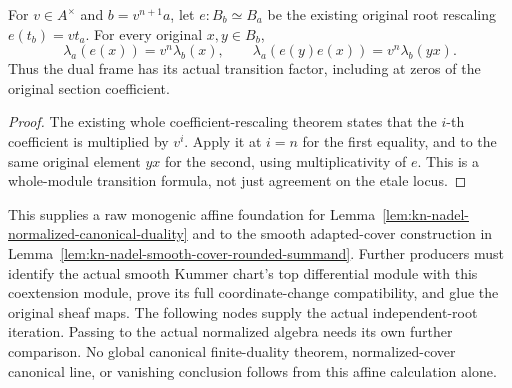 \begin{lemma}
\label{lem:kn-nadel-root-dual-rescaling}
\leanok
For $v\in A^\times$ and $b=v^{n+1}a$, let
$e:B_b\simeq B_a$ be the existing original root rescaling
$e(t_b)=v t_a$.  For every original $x,y\in B_b$,
\[
 \lambda_a(e(x))=v^n\lambda_b(x),\qquad
 \lambda_a(e(y)e(x))=v^n\lambda_b(yx).
\]
Thus the dual frame has its actual transition factor, including
at zeros of the original section coefficient.
\end{lemma}
\begin{proof}
The existing whole coefficient-rescaling theorem states that the
$i$-th coefficient is multiplied by $v^i$.  Apply it at $i=n$
for the first equality, and to the same original element $yx$ for
the second, using multiplicativity of $e$.  This is a whole-module
transition formula, not just agreement on the etale locus.
\end{proof}

This supplies a raw monogenic affine foundation for
Lemma~\ref{lem:kn-nadel-normalized-canonical-duality} and to the
smooth adapted-cover construction in
Lemma~\ref{lem:kn-nadel-smooth-cover-rounded-summand}.  Further
producers must identify the actual smooth Kummer chart's top
differential module with this coextension module, prove its full
coordinate-change compatibility, and glue the original sheaf maps.
The following nodes supply the actual independent-root iteration.
Passing to the
actual normalized algebra needs its own further comparison.  No global
canonical finite-duality theorem, normalized-cover canonical line,
or vanishing conclusion follows from this affine calculation alone.


